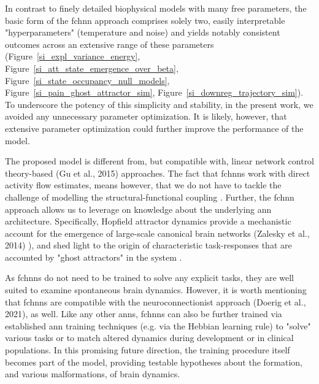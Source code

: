 \documentclass{article}
\begin{document}
In contrast to finely detailed biophysical models with many free parameters, the basic form of the \acrshort{fchnn} approach comprises solely two, easily interpretable  "hyperparameters" (temperature and noise) and yields notably consistent outcomes across an extensive range of these parameters (Figure~\ref{si_expl_variance_energy}, Figure~\ref{si_att_state_emergence_over_beta}, Figure~\ref{si_state_occupancy_null_models}, Figure~\ref{si_pain_ghost_attractor_sim}, Figure~\ref{si_downreg_trajectory_sim}). To underscore the potency of this simplicity and stability, in the present work, we avoided any unnecessary parameter optimization. It is likely, however, that extensive parameter optimization could further improve the performance of the model.


The proposed model is different from, but compatible with, linear network control theory-based (Gu et al., 2015) approaches. The fact that \acrshort{fchnn}s work with direct activity flow estimates, means however, that we do not have to tackle the challenge of modelling the structural-functional coupling \citep{seguin2023brain}. Further, the \acrshort{fchnn} approach allows us to leverage on knowledge about the underlying \acrshort{ann} architecture. Specifically, Hopfield attractor dynamics provide a mechanistic account for the emergence of large-scale canonical brain networks (Zalesky et al., 2014) ), and shed light to the origin of characteristic task-responses that are accounted by "ghost attractors" in the system \citep{deco2012ongoing, vohryzek2020ghost}.

As \acrshort{fchnn}s do not need to be trained to solve any explicit tasks, they are well suited to examine spontaneous brain dynamics. However, it is worth mentioning that \acrshort{fchnn}s are compatible with the neuroconnectionist approach (Doerig et al., 2021), as well.
Like any other \acrshort{ann}s, \acrshort{fchnn}s can also be further trained via established \acrshort{ann} training techniques (e.g. via the Hebbian learning rule) to "solve" various tasks or to match altered dynamics during development or in clinical populations. In this promising future direction, the training procedure itself becomes part of the model, providing testable hypotheses about the formation, and various malformations, of brain dynamics.
\end{document}
